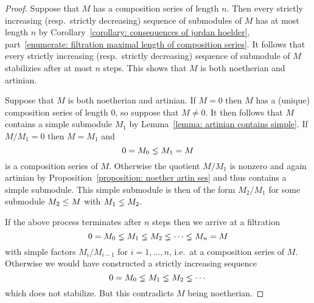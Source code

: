 \begin{proof}
  Suppose that $M$ has a composition series of length $n$.
  Then every strictly increasing (resp.\ strictly decreasing) sequence of submodules of $M$ has at most length $n$ by Corollary~\ref{corollary: consequences of jordan hoelder}, part~\ref*{enumerate: filtration maximal length of composition series}.
  It follows that every strictly increasing (resp.\ strictly decreasing) sequence of submodule of $M$ stabilizies after at most $n$ steps.
  This shows that $M$ is both noetherian and artinian.
  
  Suppose that $M$ is both noetherian and artinian.
  If $M = 0$ then $M$ has a (unique) composition series of length $0$, so suppose that $M \neq 0$.
  It then follows that $M$ contains a simple submodule $M_1$ by Lemma~\ref{lemma: artinian contains simple}.
  If $M/M_1 = 0$ then $M = M_1$ and
  \[
                0
    =           M_0
    \lneq M_1
    =           M
  \]
  is a composition series of $M$.
  Otherwise the quotient $M/M_1$ is nonzero and again artinian by Proposition~\ref{proposition: noether artin ses} and thus contains a simple submodule.
  This simple submodule is then of the form $M_2/M_1$ for some submodule $M_2 \leq M$ with $M_1 \lneq M_2$.
  
  If the above process terminates after $n$ steps then we arrive at a filtration
  \[
                0
    =           M_0
    \lneq M_1
    \lneq M_2
    \lneq \dotsb
    \lneq M_n
    =           M
  \]
  with simple factors $M_i/M_{i-1}$ for $i = 1, \dotsc, n$, i.e.\ at a composition series of $M$.
  Otherwise we would have constructed a strictly increasing sequence
  \[
                 0
    =            M_0
    \lneq  M_1
    \lneq  M_2
    \lneq  \dotsb
  \]
  which does not stabilize.
  But this contradicts $M$ being noetherian.
\end{proof}





